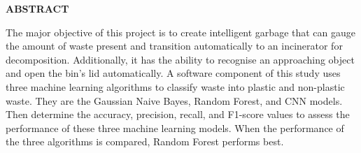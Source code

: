 




\begin{center}
\textbf{\LARGE{ABSTRACT}}\\[1cm]

\end{center}
\normalsize
The major objective of this project is to create intelligent garbage that can gauge the amount of waste present and transition automatically to an incinerator for decomposition. Additionally, it has the ability to recognise an approaching object and open the bin's lid automatically. A software component of this study uses three machine learning algorithms to classify waste into plastic and non-plastic waste. They are the Gaussian Naive Bayes, Random Forest, and CNN models. Then determine the accuracy, precision, recall, and F1-score values to assess the performance of these three machine learning models. When the performance of the three algorithms is compared, Random Forest performs best.





